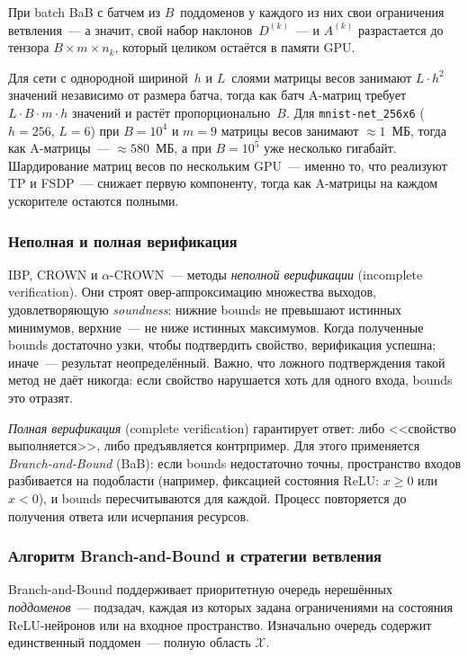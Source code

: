 При batch BaB с батчем из $B$~поддоменов у каждого из них свои
ограничения ветвления~--- а значит, свой набор наклонов~$D^{(k)}$~---
и $A^{(k)}$ разрастается до тензора $B \times m \times n_k$,
который целиком остаётся в памяти GPU.

Для сети с однородной шириной~$h$ и $L$~слоями матрицы весов
занимают $L \cdot h^2$ значений независимо от размера батча,
тогда как батч A-матриц требует $L \cdot B \cdot m \cdot h$ значений
и растёт пропорционально~$B$.
Для \texttt{mnist-net\_256x6} ($h{=}256$, $L{=}6$) при $B{=}10^4$
и $m{=}9$ матрицы весов занимают $\approx\!1$~МБ,
тогда как A-матрицы~--- $\approx\!580$~МБ, а при $B{=}10^5$
уже несколько гигабайт.
Шардирование матриц весов по нескольким GPU~--- именно то,
что реализуют TP и FSDP~--- снижает первую компоненту,
тогда как A-матрицы на каждом ускорителе остаются полными.

\subsubsection{Неполная и полная верификация}

IBP, CROWN и $\alpha$-CROWN~--- методы \textit{неполной верификации}
(incomplete verification). Они строят овер-аппроксимацию множества
выходов, удовлетворяющую \textit{soundness}: нижние bounds не
превышают истинных минимумов, верхние~--- не ниже истинных максимумов.
Когда полученные bounds достаточно узки, чтобы подтвердить свойство,
верификация успешна; иначе~--- результат неопределённый.
Важно, что ложного подтверждения такой метод не даёт никогда:
если свойство нарушается хоть для одного входа, bounds это отразят.

\textit{Полная верификация} (complete verification) гарантирует ответ:
либо <<свойство выполняется>>, либо предъявляется контрпример.
Для этого применяется \textit{Branch-and-Bound} (BaB): если bounds
недостаточно точны, пространство входов разбивается на подобласти
(например, фиксацией состояния ReLU: $x \geq 0$ или $x < 0$),
и bounds пересчитываются для каждой.
Процесс повторяется до получения ответа или исчерпания ресурсов.

\subsubsection{Алгоритм Branch-and-Bound и стратегии ветвления}
\label{sec:bab-algorithm}

Branch-and-Bound поддерживает приоритетную очередь нерешённых
\textit{поддоменов}~--- подзадач, каждая из которых задана
ограничениями на состояния ReLU-нейронов или на входное пространство.
Изначально очередь содержит единственный поддомен~--- полную
область $\mathcal{X}$.

